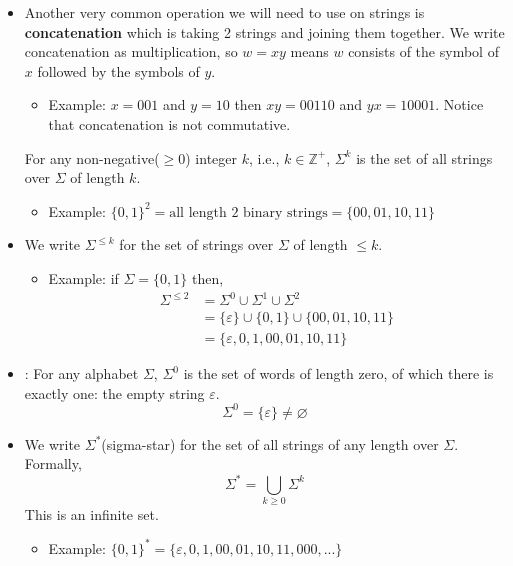 \documentclass[11pt]{article}
\begin{document}
\begin{itemize}
\begin{itemize}
        \item [$ $] Example: $w=110$ then $w_1=1$, $w_2=1$, $w_3=0$.
    \end{itemize}
    \item Another very common operation we will need to use on strings is \textbf{concatenation} which is taking 2 strings and joining them together. We write concatenation as multiplication, so $w=xy$ means $w$ consists of the symbol of $x$ followed by the symbols of $y$.
    \begin{itemize}
        \item [$ $] Example: $x=001$ and $y=10$ then $xy=00110$ and $yx=10001$. Notice that concatenation is not commutative.
    \end{itemize}
    \begin{tcolorbox} [title= Definition:, colback=black!10!white]
        For any non-negative($\ge 0$) integer $k$, i.e., $k\in\mathbb{Z}^+$, $\Sigma^k$ is the set of all strings over $\Sigma$ of length $k$.
    \end{tcolorbox}
    \begin{itemize}
        \item[$ $] Example: $\{0,1\}^2=\text{all length 2 binary strings} = \{00,01,10,11\}$
    \end{itemize} 
    \item We write $\Sigma^{\le k}$ for the set of strings over $\Sigma$ of length $\le k$. 
    \begin{itemize}
        \item [$ $] Example: if $\Sigma=\{0,1\}$ then,
        \begin{align*}
            \Sigma^{\le 2} &= \Sigma^0 \cup \Sigma^1 \cup \Sigma^2 \\
                           &= \{\varepsilon\} \cup \{0,1\} \cup \{00,01,10,11\} \\
                           &= \{\varepsilon, 0, 1, 00, 01, 10, 11\}
        \end{align*}
        

    \end{itemize}
    \item[$ $] : For any alphabet $\Sigma$, $\Sigma^0$ is the set of words of length zero, of which there is exactly one: the empty string $\varepsilon$.
    $$\Sigma^0 = \{\varepsilon\}\neq\varnothing$$
    \item We write $\Sigma^*$(sigma-star) for the set of all strings of any length over $\Sigma$. Formally, $$\Sigma^*=\bigcup_{k\ge0}\Sigma^k$$
    This is an infinite set.
    \begin{itemize}
        \item [$ $] Example: $\{0,1\}^*=\{\varepsilon, 0, 1, 00, 01, 10, 11, 000,...\}$
    \end{itemize}
\end{itemize}
\end{document}
